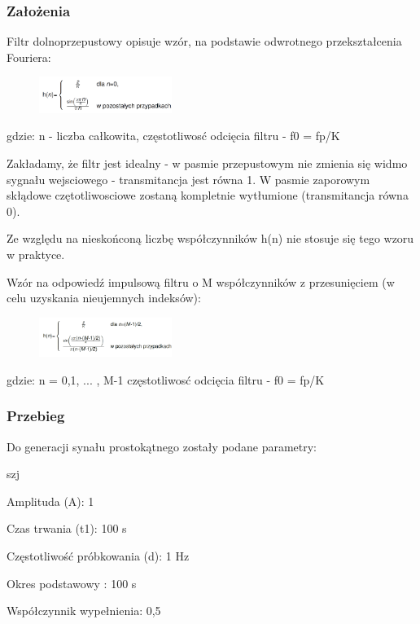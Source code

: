 \documentclass[12pt]{article}
\begin{document}
\subsubsection{Założenia}
Filtr dolnoprzepustowy opisuje wzór, na podstawie odwrotnego przekształcenia Fouriera:

\begin{figure}[h!]
 \centering
 \includegraphics[width=4.3cm]{four.PNG}
 \vspace{-0.3cm}
 \label{gw}
\end{figure}

gdzie:
\subitem n - liczba całkowita,
\subitem częstotliwosć odcięcia filtru - f0 =  fp/K

Zakładamy, że filtr jest idealny -  w pasmie przepustowym nie zmienia się widmo sygnału wejsciowego -  transmitancja jest równa  1. W pasmie zaporowym skłądowe czętotliwosciowe zostaną kompletnie wytłumione (transmitancja równa 0).

Ze względu na nieskońconą liczbę współczynników h(n) nie stosuje się tego wzoru w praktyce.

Wzór na odpowiedź impulsową filtru o M współczynników z przesunięciem (w celu uzyskania nieujemnych indeksów):

\begin{figure}[h!]
 \centering
 \includegraphics[width=4.3cm]{f.PNG}
 \vspace{-0.3cm}
 \label{gw}
\end{figure}

gdzie:
\subitem n = 0,1, ... , M-1
\subitem częstotliwosć odcięcia filtru - f0 =  fp/K

\subsubsection{Przebieg}
Do generacji synału prostokątnego zostały podane parametry:

\begin{labeling}{szj}
\item [Amplituda (A):] 1
\item [Czas trwania (t1):] 100 s
\item [Częstotliwość próbkowania (d): ] 1 Hz
\item [Okres podstawowy :] 100 s
\item [Współczynnik wypełnienia:] 0,5
\end{labeling}
\end{document}

